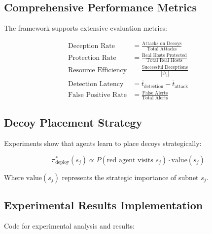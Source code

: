 \documentclass[12pt,a4paper]{article}
\begin{document}
\subsection{Comprehensive Performance Metrics}
The framework supports extensive evaluation metrics:

\begin{align}
\text{Deception Rate} &= \frac{\text{Attacks on Decoys}}{\text{Total Attacks}} \\
\text{Protection Rate} &= \frac{\text{Real Hosts Protected}}{\text{Total Real Hosts}} \\
\text{Resource Efficiency} &= \frac{\text{Successful Deceptions}}{|\mathcal{D}_t|} \\
\text{Detection Latency} &= \bar{t}_{\text{detection}} - \bar{t}_{\text{attack}} \\
\text{False Positive Rate} &= \frac{\text{False Alerts}}{\text{Total Alerts}}
\end{align}

\subsection{Decoy Placement Strategy}
Experiments show that agents learn to place decoys strategically:

\begin{equation}
\pi^*_{\text{deploy}}(s_j) \propto P(\text{red agent visits } s_j) \cdot \text{value}(s_j)
\end{equation}

Where $\text{value}(s_j)$ represents the strategic importance of subnet $s_j$.

\subsection{Experimental Results Implementation}
Code for experimental analysis and results:
\end{document}
